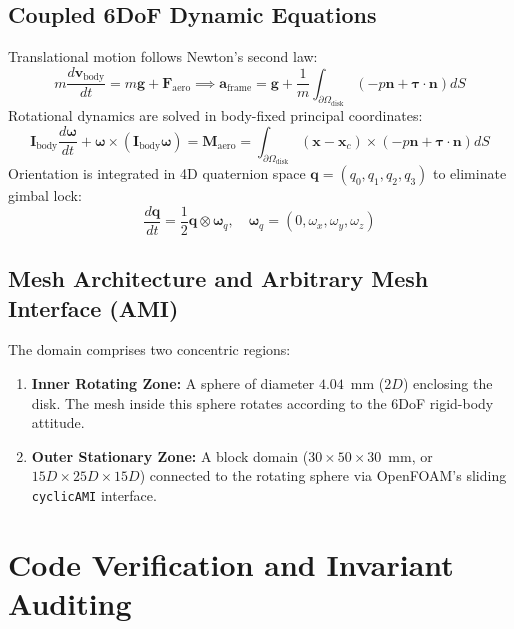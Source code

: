 \documentclass[11pt,a4paper]{article}
\begin{document}
\subsection{Coupled 6DoF Dynamic Equations}
Translational motion follows Newton's second law:
\begin{equation}
m \frac{d\mathbf{v}_{\mathrm{body}}}{dt} = m \mathbf{g} + \mathbf{F}_{\mathrm{aero}} \implies \mathbf{a}_{\mathrm{frame}} = \mathbf{g} + \frac{1}{m} \int_{\partial \Omega_{\mathrm{disk}}} \left( -p \mathbf{n} + \boldsymbol{\tau} \cdot \mathbf{n} \right) dS
\end{equation}
Rotational dynamics are solved in body-fixed principal coordinates:
\begin{equation}
\mathbf{I}_{\mathrm{body}} \frac{d\boldsymbol{\omega}}{dt} + \boldsymbol{\omega} \times (\mathbf{I}_{\mathrm{body}} \boldsymbol{\omega}) = \mathbf{M}_{\mathrm{aero}} = \int_{\partial \Omega_{\mathrm{disk}}} (\mathbf{x} - \mathbf{x}_c) \times \left( -p \mathbf{n} + \boldsymbol{\tau} \cdot \mathbf{n} \right) dS
\end{equation}
Orientation is integrated in 4D quaternion space $\mathbf{q} = (q_0, q_1, q_2, q_3)$ to eliminate gimbal lock:
\begin{equation}
\frac{d\mathbf{q}}{dt} = \frac{1}{2} \mathbf{q} \otimes \boldsymbol{\omega}_q, \quad \boldsymbol{\omega}_q = (0, \omega_x, \omega_y, \omega_z)
\end{equation}

\subsection{Mesh Architecture and Arbitrary Mesh Interface (AMI)}
The domain comprises two concentric regions:
\begin{enumerate}
    \item \textbf{Inner Rotating Zone:} A sphere of diameter $4.04$~mm ($2 D$) enclosing the disk. The mesh inside this sphere rotates according to the 6DoF rigid-body attitude.
    \item \textbf{Outer Stationary Zone:} A block domain ($30 \times 50 \times 30$~mm, or $15 D \times 25 D \times 15 D$) connected to the rotating sphere via OpenFOAM's sliding \texttt{cyclicAMI} interface.
\end{enumerate}

\section{Code Verification and Invariant Auditing}
\end{document}
